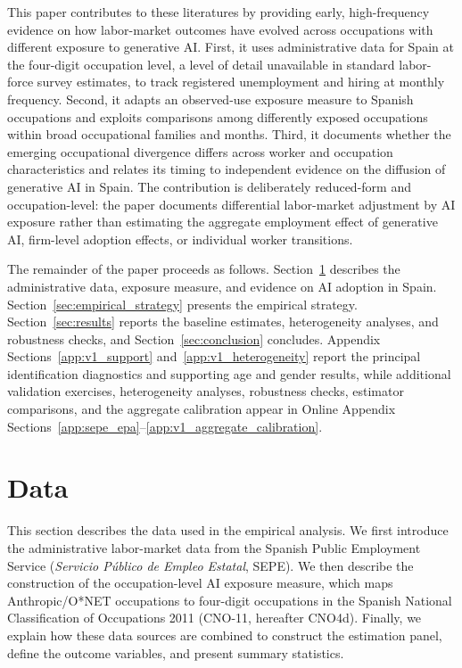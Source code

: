 \documentclass[11pt]{article}
\begin{document}
This paper contributes to these literatures by providing early, high-frequency evidence on how labor-market outcomes have evolved across occupations with different exposure to generative AI. First, it uses administrative data for Spain at the four-digit occupation level, a level of detail unavailable in standard labor-force survey estimates, to track registered unemployment and hiring at monthly frequency. Second, it adapts an observed-use exposure measure to Spanish occupations and exploits comparisons among differently exposed occupations within broad occupational families and months. Third, it documents whether the emerging occupational divergence differs across worker and occupation characteristics and relates its timing to independent evidence on the diffusion of generative AI in Spain. The contribution is deliberately reduced-form and occupation-level: the paper documents differential labor-market adjustment by AI exposure rather than estimating the aggregate employment effect of generative AI, firm-level adoption effects, or individual worker transitions.

The remainder of the paper proceeds as follows. Section~\ref{sec:data} describes the administrative data, exposure measure, and evidence on AI adoption in Spain. Section~\ref{sec:empirical_strategy} presents the empirical strategy. Section~\ref{sec:results} reports the baseline estimates, heterogeneity analyses, and robustness checks, and Section~\ref{sec:conclusion} concludes. Appendix Sections~\ref{app:v1_support} and~\ref{app:v1_heterogeneity} report the principal identification diagnostics and supporting age and gender results, while additional validation exercises, heterogeneity analyses, robustness checks, estimator comparisons, and the aggregate calibration appear in Online Appendix Sections~\ref{app:sepe_epa}--\ref{app:v1_aggregate_calibration}.

\section{Data}
\label{sec:data}

This section describes the data used in the empirical analysis. We first introduce the administrative labor-market data from the Spanish Public Employment Service (\textit{Servicio P\'ublico de Empleo Estatal}, SEPE). We then describe the construction of the occupation-level AI exposure measure, which maps Anthropic/O*NET occupations to four-digit occupations in the Spanish National Classification of Occupations 2011 (CNO-11, hereafter CNO4d). Finally, we explain how these data sources are combined to construct the estimation panel, define the outcome variables, and present summary statistics.
\end{document}
